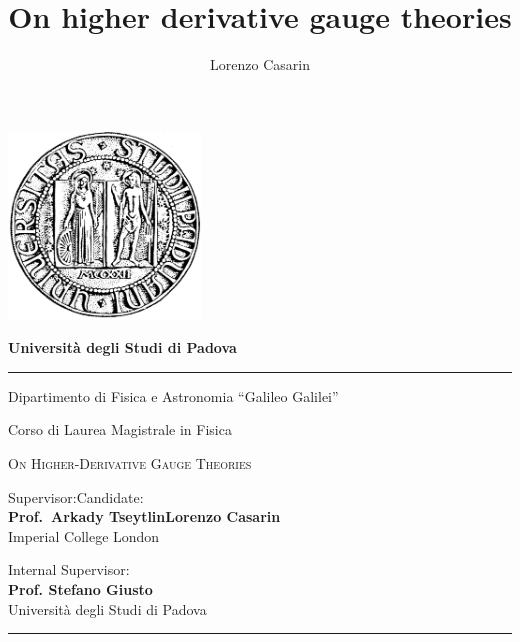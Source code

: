 \documentclass[10pt,a4paper,openany]{book}
\title{\bf On higher derivative gauge theories}
\author{Lorenzo Casarin}
\newcommand{\1}{ { \mathbbm{1} } }
\numberwithin{equation}{section} %
\begin{document}
	\pagestyle{empty}
	
	\begin{center}
	\includegraphics[height=5cm]{logo-unipd.png}
	\vspace{2em}
	
	\textbf{
	\Large	Universit\`{a} degli Studi di Padova
	}

	\rule{\textwidth}{0.4pt}
	
	{
	\large	
	
	Dipartimento di Fisica e Astronomia ``Galileo Galilei''
	
	Corso di Laurea Magistrale in Fisica
	}	
	
	\end{center}
	

	\vspace{8em}
	
	
	\begin{center}
	\scshape
	\huge
	On Higher-Derivative Gauge Theories
	\end{center}
	
	
	

	\vspace{6em}
	
	
	\begin{flushleft}
	
	
	{Supervisor:\hfill{}Candidate:}\\[0.5em]	
	\textbf{\Large Prof.\ Arkady Tseytlin\hfill{}Lorenzo Casarin}\\[0.15em]
	{\large Imperial College London}
	
	\vspace{2em}	
	
	{Internal Supervisor:}\\[0.5em]
	\textbf{\Large Prof. Stefano Giusto}\\[0.15em]
	{\large Universit\`{a} degli Studi di Padova}
	
	
	\end{flushleft}
	
	\vfill
	
	
	\noindent\rule{\textwidth}{0.4pt}
	
\end{document}
